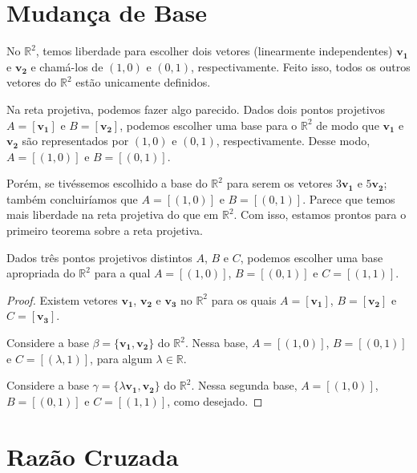 \section{Mudança de Base}

No \(\mathbb{R}^2\), temos liberdade para escolher dois vetores (linearmente independentes) \(\mathbf{v_1}\) e \(\mathbf{v_2}\) e chamá-los de \((1, 0)\) e \((0, 1)\), respectivamente.
Feito isso, todos os outros vetores do \(\mathbb{R}^2\) estão unicamente definidos.

Na reta projetiva, podemos fazer algo parecido. Dados dois pontos projetivos \(A = [\mathbf{v_1}]\) e \(B = [\mathbf{v_2}]\), podemos escolher uma base para o \(\mathbb{R}^2\) de modo que \(\mathbf{v_1}\) e \(\mathbf{v_2}\) são representados por \((1, 0)\) e \((0, 1)\), respectivamente.
Desse modo, \(A = [(1, 0)]\) e  \(B = [(0, 1)]\).

Porém, se tivéssemos escolhido a base do \(\mathbb{R}^2\) para serem os vetores \(3\mathbf{v_1}\) e  \(5\mathbf{v_2}\); também concluiríamos que \(A = [(1, 0)] \) e \(B = [(0, 1)]\). Parece que temos mais liberdade na reta projetiva do que em \(\mathbb{R}^2\). Com isso, estamos prontos para o primeiro teorema sobre a reta projetiva.

\begin{thm}\label{thm:trespontos}
  Dados três pontos projetivos distintos \(A\), \(B\) e \(C\), podemos escolher uma base apropriada do \(\mathbb{R}^2\) para a qual \(A = [(1, 0)]\),  \(B = [(0, 1)]\) e \(C = [(1, 1)]\).
\end{thm}
\begin{proof}
  Existem vetores \(\mathbf{v_1}\), \(\mathbf{v_2}\) e \(\mathbf{v_3}\) no \(\mathbb{R}^2\) para os quais \(A = [\mathbf{v_1}]\), \(B = [\mathbf{v_2}]\) e \(C = [\mathbf{v_3}]\).

  Considere a base \(\beta = \{\mathbf{v_1}, \mathbf{v_2}\}\) do \(\mathbb{R}^2\). Nessa base, \(A = [(1, 0)]\),  \(B = [(0, 1)]\) e \(C = [(\lambda, 1)]\), para algum \(\lambda \in \mathbb{R}\).

  Considere a base \(\gamma = \{\lambda\mathbf{v_1}, \mathbf{v_2}\}\) do \(\mathbb{R}^2\). Nessa segunda base, \(A = [(1, 0)]\),  \(B = [(0, 1)]\) e \(C = [(1, 1)]\), como desejado.
\end{proof}

\section{Razão Cruzada}

